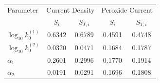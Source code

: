 \begin{tabular}{l c c c c}
\toprule
Parameter & \multicolumn{2}{c}{Current Density} & \multicolumn{2}{c}{Peroxide Current} \\
 & $S_i$ & $S_{T,i}$ & $S_i$ & $S_{T,i}$ \\
\midrule
$\log_{10} k_0^{(1)}$ & 0.6342 & 0.6789 & 0.4591 & 0.4748 \\
$\log_{10} k_0^{(2)}$ & 0.0320 & 0.0471 & 0.1684 & 0.1787 \\
$\alpha_1$ & 0.2601 & 0.2996 & 0.1770 & 0.1914 \\
$\alpha_2$ & 0.0191 & 0.0291 & 0.1696 & 0.1808 \\
\bottomrule
\end{tabular}
